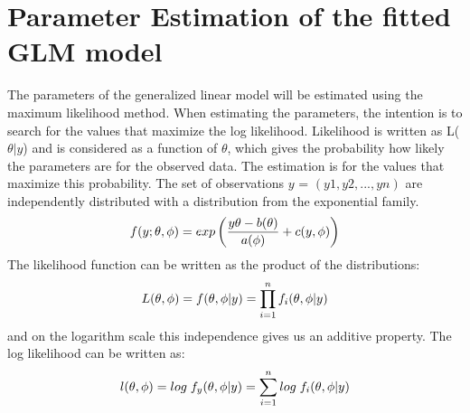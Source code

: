 \section{Parameter Estimation of the fitted GLM model}
The parameters of the generalized linear model will be estimated using the maximum likelihood method. When estimating the parameters, the intention is to search for the values that maximize the log likelihood. %
Likelihood is written as L($\theta|y$) and is considered as a function of $\theta$, which gives the probability how likely the parameters \bm{$\theta$} are for the observed data. The estimation is for the values that maximize this probability. The set of observations $y$ = $(y1,y2,...,yn)$ are independently distributed with a distribution from the exponential family.
\begin{equation}
	\centering
	f(y;\theta,\phi) = exp\left(\frac{y\theta-b(\theta)}{a(\phi)} + c(y,\phi)\right)
\end{equation}
The likelihood function can be written as the product of the distributions:
\begin{equation}
	\centering
	L(\theta,\phi) = f(\theta,\phi|y) = \prod_{i=1}^{n} f_{i} (\theta,\phi|y)
\end{equation}
and on the logarithm scale this independence gives us an additive property. The log likelihood can be written as:
\begin{equation}
	\centering
	l(\theta,\phi) = log\; f_{y}(\theta,\phi|y) = \sum_{i=1}^{n} log\; f_{i}(\theta,\phi|y)
\end{equation}
